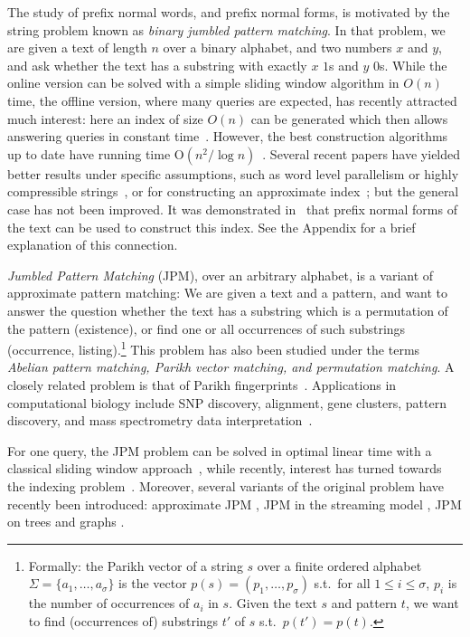 \documentclass[11pt,a4paper]{llncs}
\begin{document}
The study of prefix normal words, and prefix normal forms, is motivated by the string problem known as {\em binary jumbled pattern matching}. In that problem, we are given a text of length $n$ over a binary alphabet, and two numbers $x$ and $y$, and ask whether the text has a substring with exactly $x$ $1$s and $y$ $0$s. While the online version can be solved with a simple sliding window algorithm in $O(n)$ time, the offline version, where many queries are expected, has recently attracted much interest: here an index of size $O(n)$ can be generated which then allows answering queries in constant time~\cite{CFL09}. However, the best construction algorithms up to date have running time O$(n^2/\log n)$~\cite{BCFL10,MR10}. Several recent papers have yielded better results under specific assumptions, such as word level parallelism or highly compressible strings~\cite{MR12,BFKL13,GG13,CGGLLRT13}, or for constructing an approximate index~\cite{CLWY12}; but the general case has not been improved. It was demonstrated in~\cite{FL11,BFKL13} that prefix normal forms of the text can be used to construct this index. See the Appendix for a brief explanation of this connection.

{\em Jumbled Pattern Matching} (JPM), over an arbitrary alphabet, is a variant of approximate pattern matching: We are given a text and a pattern, and want to answer the question whether the text has a substring which is a permutation of the pattern (existence), or find one or all occurrences of such substrings (occurrence, listing).\footnote{Formally: the Parikh vector of a string $s$ over a finite ordered alphabet $\Sigma = \{a_1,\ldots, a_{\sigma}\}$ is the vector $p(s) = (p_1,\ldots, p_{\sigma})$ s.t.\ for all $1\leq i \leq \sigma$, $p_i$ is the number of occurrences of $a_i$ in $s$. Given the text $s$ and pattern $t$, we want to find (occurrences of) substrings $t'$ of $s$ s.t.\ $p(t') = p(t)$.}
This problem has also been studied under the terms {\em Abelian pattern matching, Parikh vector matching, and permutation matching}. A closely related problem is that of Parikh fingerprints~\cite{AALS03}.
Applications in computational biology include SNP discovery, alignment, gene clusters, pattern discovery, and mass spectrometry data interpretation~\cite{Boecker07,Benson03,BoeckerJMS08,DuhrkopLMB13,Parida06}. 

For one query, the JPM problem can be solved in optimal linear time with a classical sliding window approach~\cite{BEL04}, while recently, interest has turned towards the indexing problem~\cite{CFL09,KRR13}. Moreover, several variants of the original problem have recently been introduced: approximate JPM \cite{BCFL12_TOCS}, JPM in the streaming model \cite{LLZ12}, JPM on trees and graphs \cite{GHLW13,CGGLLRT13}. 
\end{document}
